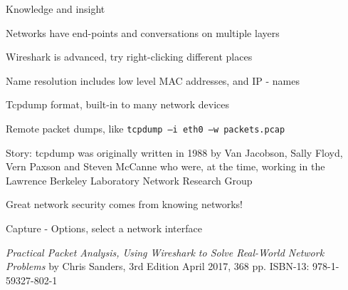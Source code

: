 \documentclass[Screen16to9,17pt]{foils}
\begin{document}




{\Large Knowledge and insight}
\begin{list2}
\item Networks have end-points and conversations on multiple layers
\item Wireshark is advanced, try right-clicking different places
\item Name resolution includes low level MAC addresses, and IP - names
\end{list2}

\begin{list2}
\item Tcpdump format, built-in to many network devices
\item Remote packet dumps, like \verb+tcpdump –i eth0 –w packets.pcap+
\item Story: tcpdump was originally written in 1988 by Van Jacobson, Sally Floyd, Vern Paxson and Steven McCanne who were, at the time, working in the Lawrence Berkeley Laboratory Network Research Group\\
\end{list2}

\vskip 5mm

\centerline{\Large Great network security comes from knowing networks!}




\centerline{Capture - Options, select a network interface}
\centerline{}









\emph{Practical Packet Analysis,
Using Wireshark to Solve Real-World Network Problems}
by Chris Sanders, 3rd Edition
April 2017, 368 pp.
ISBN-13:
978-1-59327-802-1
\end{document}
